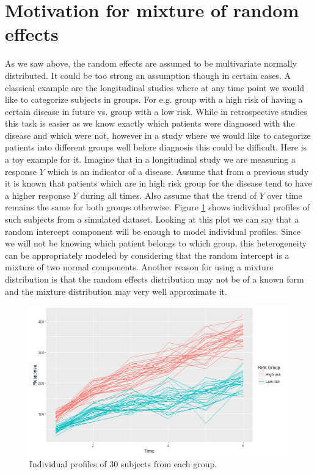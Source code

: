 \section{Motivation for mixture of random effects}
As we saw above, the random effects are assumed to be multivariate normally distributed. It could be too strong an assumption though in certain cases. A classical example are the longitudinal studies where at any time point we would like to categorize subjects in groups. For e.g. group with a high risk of having a certain disease in future vs. group with a low risk. While in retrospective studies this task is easier as we know exactly which patients were diagnosed with the disease and which were not, however in a study where we would like to categorize patients into different groups well before diagnosis this could be difficult. Here is a toy example for it. Imagine that in a longitudinal study we are measuring a response $Y$ which is an indicator of a disease. Assume that from a previous study it is known that patients which are in high risk group for the disease tend to have a higher response $Y$ during all times. Also assume that the trend of $Y$ over time remains the same for both groups otherwise. Figure \ref{fig : random_slope_dummy_data} shows individual profiles of such subjects from a simulated dataset. Looking at this plot we can say that a random intercept component will be enough to model individual profiles. Since we will not be knowing which patient belongs to which group, this heterogeneity can be appropriately modeled by considering that the random intercept is a mixture of two normal components. Another reason for using a mixture distribution is that the random effects distribution may not be of a known form and the mixture distribution may very well approximate it.\\

\begin{figure}
	\centering
	\includegraphics[scale=0.5]{mainmatter/chapter_3_blmm/random_slope_dummy_data.png}
	\caption{Individual profiles of 30 subjects from each group.}
	\label{fig : random_slope_dummy_data}
\end{figure}

